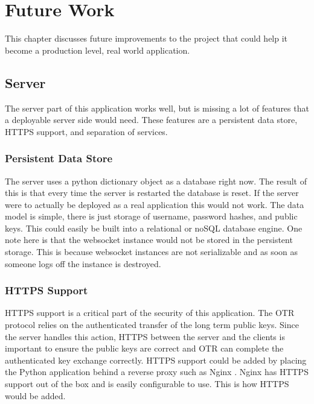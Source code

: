 

\chapter{Future Work}


This chapter discusses future improvements to the project that could help it become a production level, real world application.


\section{Server}


The server part of this application works well, but is missing a lot of features that a deployable server side would need. These features are a persistent data store, HTTPS support, and separation of services.


\subsection{Persistent Data Store}


The server uses a python dictionary object as a database right now. The result of this is that every time the server is restarted the database is reset. If the server were to actually be deployed as a real application this would not work. The data model is simple, there is just storage of username, password hashes, and public keys. This could easily be built into a relational or noSQL database engine. One note here is that the websocket instance would not be stored in the persistent storage. This is because websocket instances are not serializable and as soon as someone logs off the instance is destroyed.


\subsection{HTTPS Support}


HTTPS support is a critical part of the security of this application. The OTR protocol relies on the authenticated transfer of the long term public keys. Since the server handles this action, HTTPS between the server and the clients is important to ensure the public keys are correct and OTR can complete the authenticated key exchange correctly. HTTPS support could be added by placing the Python application behind a reverse proxy such as Nginx \cite{nginx}. Nginx has HTTPS support out of the box and is easily configurable to use. This is how HTTPS would be added.


